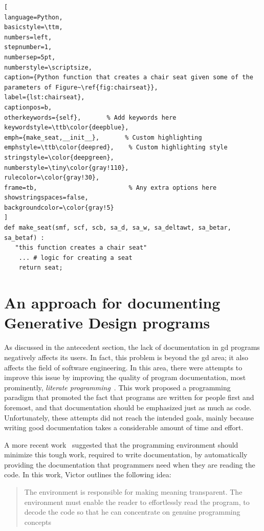 \begin{lstlisting}[
language=Python,
basicstyle=\ttm,
numbers=left,
stepnumber=1,
numbersep=5pt,                   
numberstyle=\scriptsize, 
caption={Python function that creates a chair seat given some of the parameters of Figure~\ref{fig:chairseat}},
label={lst:chairseat},
captionpos=b, 
otherkeywords={self},       % Add keywords here
keywordstyle=\ttb\color{deepblue},
emph={make_seat,__init__},       % Custom highlighting
emphstyle=\ttb\color{deepred},    % Custom highlighting style
stringstyle=\color{deepgreen},
numberstyle=\tiny\color{gray!110},
rulecolor=\color{gray!30},
frame=tb,                         % Any extra options here
showstringspaces=false,
backgroundcolor=\color{gray!5} 
]
def make_seat(smf, scf, scb, sa_d, sa_w, sa_deltawt, sa_betar, sa_betaf) :
   "this function creates a chair seat"
    ... # logic for creating a seat
    return seat;
\end{lstlisting}


\section{An approach for documenting Generative Design programs}

As discussed in the antecedent section, the lack of documentation in \gls{gd} programs negatively affects its users. In fact, this problem is beyond the \gls{gd} area; it also affects the field of software engineering. In this area, there were attempts to improve this issue by improving the quality of program documentation, most prominently, \textit{literate programming}~\citep{knuth1984literate}. This work proposed a programming paradigm that promoted the fact that programs are written for people first and foremost, and that documentation should be emphasized just as much as code. Unfortunately, these attempts did not reach the intended goals, mainly because writing good documentation takes a considerable amount of time and effort.

A more recent work~\citep{learnableProg} suggested that the programming environment should minimize this tough work, required to write documentation, by automatically providing the documentation that programmers need when they are reading the code. In this work, Victor outlines the following idea:

\blockquote{The environment is responsible for making meaning transparent. The environment must enable the reader to effortlessly read the program, to decode the code so that he can concentrate on genuine programming concepts~\citep{learnableProg}}

